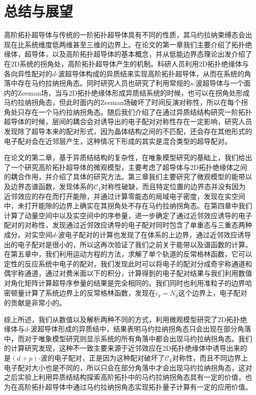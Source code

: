 \section{总结与展望}
高阶拓扑超导体与传统的一阶拓扑超导体具有不同的性质，其马约拉纳束缚态会出现在比系统维度低两维甚至三维的边界上。在论文的第一章我们主要介绍了拓扑绝缘体，超导体，以及高阶拓扑超导体的基本概念，并从低能边界态理论出发介绍了在2D系统的拐角处，高阶拓扑超导体产生的机制。科研人员利用2D拓扑绝缘体与各向异性配对的$d$-波超导体构成的异质结来实现高阶拓扑超导体，从而在系统的角落中存在马约拉纳拐角态。同时研究人员也研究了利用常规的$s$-波超导体与一个面内的Zeeman场，当与2D拓扑绝缘体形成异质结系统的时候，也可以在拐角处形成马约拉纳拐角态，但此时面内的Zeeman场破坏了时间反演对称性，所以在每个拐角处只存在一个马约拉纳拐角态。随后我们介绍了在通过异质结结构研究一阶拓扑超导体的时候，层间的耦合会对诱导出的电子配对对称性存在一定影响，研究人员发现除了超导本来的配对形式，因为晶体结构之间的不匹配，还会存在其他形式的电子配对会在近邻层产生，这种情况下形成的其实是混合类型的超导配对。

在论文的第二章，基于异质结结构的复杂性，在唯象模型研究的基础上，我们给出了一个研究高阶拓扑超导体的微观模型，主要考虑了超导体与2D拓扑绝缘体之间的耦合作用，并介绍了具体的研究方法。第三章我们主要研究了微观模型的能带以及边界态谱函数，发现体系的$\mathcal{C}_4$对称性破缺，而且特定位置的边界态并没有因为近邻效应的存在而打开能隙，并通过计算零能态的局域电子密度，发现在实空间中，未打开能隙的边界上确实在其拐角处不存在马约拉纳拐角态。在第四章中我们计算了动量空间中以及实空间中的序参量，进一步确定了通过近邻效应诱导的电子配对的对称性，发现通过近邻效应诱导的电子配对同时包含了单重态与三重态两种成分。对实空间$d$-波电子配对的计算也发现了在体系的上边界，通过近邻效应诱导出的电子配对是很小的，所以这再次验证了我们之前关于能带以及谱函数的计算。在第五章中，我们利用运动方程的方法，求解了单个轨道的反常格林函数，它可以定性的反应系统中电子的配对，我们发现此时可以将电子的配对分成奇宇称通道和偶宇称通道，通过对费米面以下的积分，计算得到的电子配对结果与我们利用数值对角化矩阵计算超导序参量的结果是完全相同的。我们同时也利用准粒子的边界哈密顿量计算了系统边界上的反常格林函数，发现在$i_y=N_y$这个边界上，电子配对的贡献是非常小的。

综上所述，我们从数值以及解析两种不同的方式，利用微观模型研究了2D拓扑绝缘体与$d$-波超导体形成的异质结中，结果表明马约拉纳拐角态只会出现在部分角落中，而对于唯象模型研究则显示系统的所有角落中都会出现马约拉纳拐角态。我们的计算研究发现，这种不一致主要来源于近邻效应在2D拓扑绝缘体中诱导出来的是$(d+p)$-波的电子配对，正是因为这种配对破坏了$\mathcal{C}_4$对称性，而且不同边界上电子配对大小也是不同的，所以只会在部分角落中才会出现马约拉纳拐角态，这对之后实验上利用异质结结构探索高阶拓扑中的马约拉纳拐角态具有一定的价值，也为在高阶拓扑超导体中通过马约拉纳拐角态实现拓扑量子计算有一定的应用价值。



